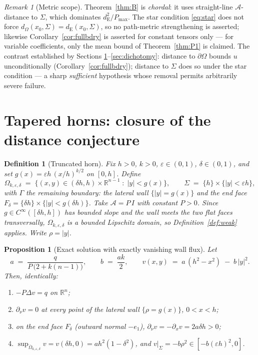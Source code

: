 \documentclass[10pt]{article}
\newtheorem{proposition}[theorem]{Proposition}
\newtheorem{definition}[theorem]{Definition}
\theoremstyle{remark}
\newtheorem{remark}[theorem]{Remark}
\newcommand{\A}{\mathcal{A}}
\newcommand{\R}{\mathbb{R}}
\newcommand{\Om}{\Omega}
\newcommand{\Sig}{\Sigma}
\newcommand{\Gam}{\Gamma}
\newcommand{\Pmax}{P_{\max}}
\newcommand{\dE}{d_{\mathrm{E}}}
\newcommand{\dP}{d_{\Om}}
\newcommand{\eps}{\varepsilon}
\begin{document}
\begin{remark}[Metric scope]\label{rem:scope}
Theorem~\ref{thm:B} is \emph{chordal}: it uses straight-line $\A$-distance to
$\Sig$, which dominates $\dE^2/\Pmax$. The star condition \eqref{eq:star} does
not force $\dP(x_0,\Sig)=\dE(x_0,\Sig)$, so no path-metric strengthening is
asserted; likewise Corollary~\ref{cor:fullbdry} is asserted for constant
tensors only --- for variable coefficients, only the mean bound of
Theorem~\ref{thm:P1} is claimed. The contrast established by Sections
\ref{sec:horn}--\ref{sec:dichotomy}: distance to $\partial\Om$ bounds $u$
unconditionally (Corollary~\ref{cor:fullbdry}); distance to $\Sig$ does so
under the star condition --- a sharp \emph{sufficient} hypothesis whose
removal permits arbitrarily severe failure.
\end{remark}

\section{Tapered horns: closure of the distance conjecture}\label{sec:horn}

\begin{definition}[Truncated horn]\label{def:horn}
Fix $h>0$, $k>0$, $\eps\in(0,1)$, $\delta\in(0,1)$, and set
$g(x)=\eps h\,(x/h)^{k/2}$ on $[0,h]$. Define
\[
\Om_{k,\eps,\delta}\;=\;\bigl\{(x,y)\in(\delta h,h)\times\R^{n-1}\;:\;
|y|<g(x)\bigr\},\qquad
\Sig\;=\;\{h\}\times\{|y|<\eps h\},
\]
with $\Gam$ the remaining boundary: the lateral wall $\{|y|=g(x)\}$ and the end
face $F_\delta=\{\delta h\}\times\{|y|<g(\delta h)\}$. Take $\A=P\,I$ with
constant $P>0$. Since $g\in C^\infty([\delta h,h])$ has bounded slope and the
wall meets the two flat faces transversally, $\Om_{k,\eps,\delta}$ is a bounded
Lipschitz domain, so Definition~\ref{def:weak} applies. Write $\rho=|y|$.
\end{definition}

\begin{proposition}[Exact solution with exactly vanishing wall flux]\label{prop:exact}
Let
\[
a\;=\;\frac{q}{P\,\bigl(2+k(n-1)\bigr)},\qquad b\;=\;\frac{ak}{2},\qquad
v(x,y)\;=\;a\,(h^2-x^2)\;-\;b\,|y|^2 .
\]
Then, identically:
\begin{enumerate}
\item[\emph{(i)}] $-P\Delta v=q$ on $\R^n$;
\item[\emph{(ii)}] $\partial_\nu v=0$ at every point of the lateral wall
$\{\rho=g(x)\}$, $0<x<h$;
\item[\emph{(iii)}] on the end face $F_\delta$ (outward normal $-e_1$),
$\partial_\nu v=-\partial_x v=2a\delta h>0$;
\item[\emph{(iv)}] $\sup_{\overline{\Om}_{k,\eps,\delta}} v=v(\delta h,0)
= a h^2(1-\delta^2)$, and $v|_{\Sig}=-b\rho^2\in[-b(\eps h)^2,0]$.
\end{enumerate}
\end{proposition}
\end{document}
